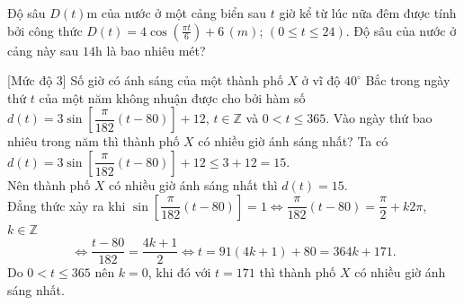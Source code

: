 \begin{bt}%
Độ sâu $D(t)$m của nước ở một cảng biển sau $t$ giờ kể từ lúc nữa đêm được tính bởi công thức $D(t) = 4 \cos \left( \frac{\pi t}{6} \right) + 6 \, (m)$; $(0\le t\le 24)$. Độ sâu của nước ở cảng này sau $14$h là bao nhiêu mét?
\end{bt}

\begin{bt}%
	[Mức độ 3]
	Số giờ có ánh sáng của một thành phố $X$ ở vĩ độ $40^\circ$ Bắc trong ngày thứ $t$ của một năm không nhuận được cho bởi hàm số $d(t)=3\sin\left[\dfrac{\pi}{182}(t-80)\right]+12$, $t\in\mathbb{Z}$ và $0<t\le 365$. Vào ngày thứ bao nhiêu trong năm thì thành phố $X$ có nhiều giờ ánh sáng nhất?
	\loigiai
	{
		Ta có $d(t)=3\sin\left[\dfrac{\pi}{182}(t-80)\right]+12\le 3+12=15$.\\
		Nên thành phố $X$ có nhiều giờ ánh sáng nhất thì $d(t)=15$.\\
		Đẳng thức xảy ra khi $\sin\left[\dfrac{\pi}{182}(t-80)\right]=1\Leftrightarrow \dfrac{\pi}{182}(t-80)=\dfrac{\pi}{2}+k2\pi$, $k\in\mathbb{Z}$
		\[\Leftrightarrow \dfrac{t-80}{182}=\dfrac{4k+1}{2}\Leftrightarrow t=91(4k+1)+80=364k+171.\]
		Do $0<t\le 365$ nên $k=0$, khi đó với $t=171$ thì thành phố $X$ có nhiều giờ ánh sáng nhất.
	}
\end{bt}

